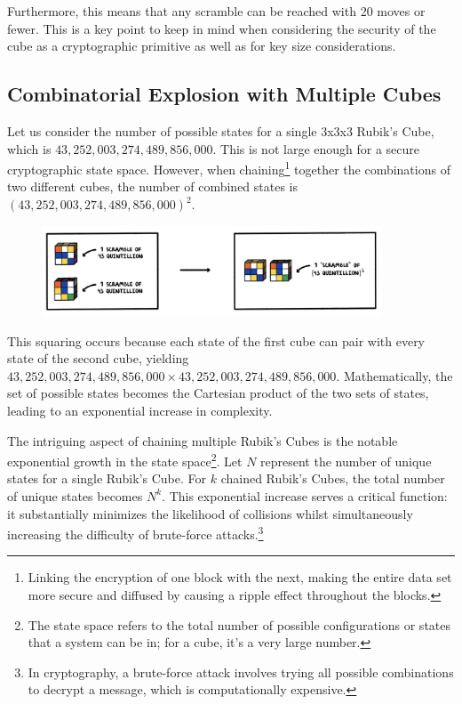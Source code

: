 \documentclass[12pt]{article}
\begin{document}
Furthermore, this means that any scramble can be reached with 20 moves or fewer. This is a key point to keep in mind when considering the security of the cube as a cryptographic primitive as well as for key size considerations.\\

\subsection{Combinatorial Explosion with Multiple Cubes}

Let us consider the number of possible states for a single 3x3x3 Rubik's Cube, which is \(43,252,003,274,489,856,000\). This is not large enough for a secure cryptographic state space. However, when chaining\footnote{Linking the encryption of one block with the next, making the entire data set more secure and diffused by causing a ripple effect throughout the blocks.} together the combinations of two different cubes, the number of combined states is \((43,252,003,274,489,856,000)^2\).

\begin{figure}[H]
    \centering
    \includegraphics[width=0.9\textwidth]{encryption/chain.jpg}
\end{figure}

This squaring occurs because each state of the first cube can pair with every state of the second cube, yielding \(43,252,003,274,489,856,000 \times 43,252,003,274,489,856,000\). Mathematically, the set of possible states becomes the Cartesian product of the two sets of states, leading to an exponential increase in complexity.

The intriguing aspect of chaining multiple Rubik's Cubes is the notable exponential growth in the state space\footnote{The state space refers to the total number of possible configurations or states that a system can be in; for a cube, it's a very large number.}. Let \( N \) represent the number of unique states for a single Rubik's Cube. For \( k \) chained Rubik's Cubes, the total number of unique states becomes \( N^k \). This exponential increase serves a critical function: it substantially minimizes the likelihood of collisions whilst simultaneously increasing the difficulty of brute-force attacks.\footnote{In cryptography, a brute-force attack involves trying all possible combinations to decrypt a message, which is computationally expensive.}
\end{document}
